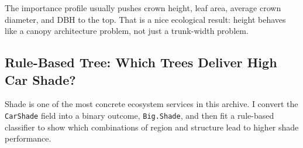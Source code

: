 \documentclass[
  11pt,
]{article}
\newenvironment{Shaded}{\begin{snugshade}}{\end{snugshade}}
\newcommand{\AttributeTok}[1]{\textcolor[rgb]{0.13,0.29,0.53}{#1}}
\newcommand{\ConstantTok}[1]{\textcolor[rgb]{0.56,0.35,0.01}{#1}}
\newcommand{\DecValTok}[1]{\textcolor[rgb]{0.00,0.00,0.81}{#1}}
\newcommand{\FunctionTok}[1]{\textcolor[rgb]{0.13,0.29,0.53}{\textbf{#1}}}
\newcommand{\NormalTok}[1]{#1}
\newcommand{\OtherTok}[1]{\textcolor[rgb]{0.56,0.35,0.01}{#1}}
\newcommand{\SpecialCharTok}[1]{\textcolor[rgb]{0.81,0.36,0.00}{\textbf{#1}}}
\newcommand{\StringTok}[1]{\textcolor[rgb]{0.31,0.60,0.02}{#1}}
\begin{document}
The importance profile usually pushes crown height, leaf area, average
crown diameter, and DBH to the top. That is a nice ecological result:
height behaves like a canopy architecture problem, not just a
trunk-width problem.

\subsection{Rule-Based Tree: Which Trees Deliver High Car
Shade?}\label{rule-based-tree-which-trees-deliver-high-car-shade}

Shade is one of the most concrete ecosystem services in this archive. I
convert the \texttt{CarShade} field into a binary outcome,
\texttt{Big.Shade}, and then fit a rule-based classifier to show which
combinations of region and structure lead to higher shade performance.

\begin{Shaded}
\end{Shaded}
\end{document}
